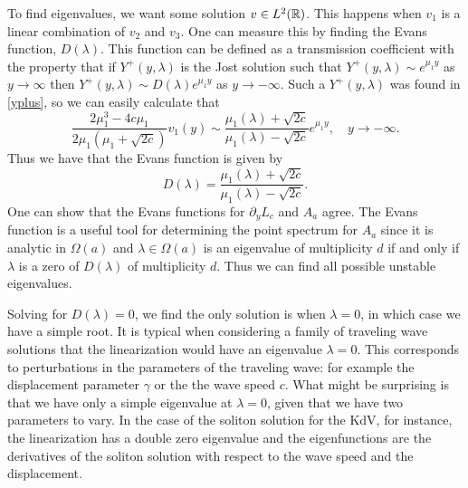 To find eigenvalues, we want some solution \(v\in L^2(\mathbb{R})\). This happens when \(v_1\) is a linear combination of \(v_2\) and \(v_3\). One can measure this by finding the Evans function, \(D(\lambda)\). This function can be defined as a transmission coefficient with the property that if \(Y^+(y,\lambda)\) is the Jost solution such that  \(Y^+(y,\lambda)\sim e^{\mu_1 y}\) as \(y\to \infty\) then \(Y^+(y,\lambda) \sim D(\lambda) e^{\mu_1 y}\) as \(y\to-\infty\). Such a \(Y^+(y,\lambda)\) was found in \cref{yplus}, so we can easily calculate that
\begin{equation*} 
	\frac{2\mu_1^3 - 4c\mu_1}{2\mu_1(\mu_1 + \sqrt{2c})} v_1(y) \sim \frac{\mu_1(\lambda) + \sqrt{2c}}{\mu_1(\lambda) - \sqrt{2c}} e^{\mu_1 y}, \quad y\to-\infty.
\end{equation*} 
Thus we have that the Evans function is given by
\begin{equation*} 
	D(\lambda ) = \frac{\mu_1(\lambda) + \sqrt{2c}}{\mu_1(\lambda) - \sqrt{2c}}.
\end{equation*} 
One can show that the Evans functions for \(\partial_y L_c\) and \(A_a\) agree. The Evans function is a useful tool for determining the point spectrum for \(A_a\) since it is analytic in \(\Omega(a)\) and \(\lambda \in \Omega(a)\) is an eigenvalue of multiplicity \(d\) if and only if \(\lambda\) is a zero of \(D(\lambda)\) of multiplicity \(d\). Thus we can find all possible unstable eigenvalues.

Solving for \(D(\lambda) = 0\), we find the only solution is when \(\lambda = 0\), in which case we have a simple root. It is typical when considering a family of traveling wave solutions that the linearization would have an eigenvalue \(\lambda = 0\). This corresponds to perturbations in the parameters of the traveling wave: for example the displacement parameter \(\gamma\) or the the wave speed \(c\). What might be surprising is that we have only a simple eigenvalue at \(\lambda = 0\), given that we have two parameters to vary. In the case of the soliton solution for the KdV, for instance, the linearization has a double zero eigenvalue and the eigenfunctions are the derivatives of the soliton solution with respect to the wave speed and the displacement.

